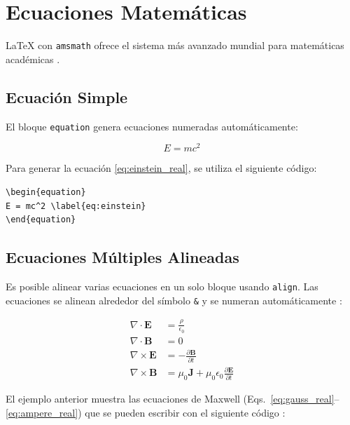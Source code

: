\section{Ecuaciones Matemáticas}

\LaTeX{} con \texttt{amsmath} ofrece el sistema más avanzado mundial para matemáticas académicas \cite{amsmath_manual}.

\subsection{Ecuación Simple}

El bloque \texttt{equation} genera ecuaciones numeradas automáticamente:

\begin{equation}
E = mc^2 \label{eq:einstein_real}
\end{equation}

Para generar la ecuación \eqref{eq:einstein_real}, se utiliza el siguiente código:

\begin{verbatim}
\begin{equation}
E = mc^2 \label{eq:einstein}
\end{equation}
\end{verbatim}


\subsection{Ecuaciones Múltiples Alineadas}

Es posible alinear varias ecuaciones en un solo bloque usando \texttt{align}. Las ecuaciones se alinean alrededor del símbolo \texttt{\&} y se numeran automáticamente \cite{amsmath_manual}:

\begin{align}
\nabla \cdot \mathbf{E} &= \frac{\rho}{\epsilon_0} \label{eq:gauss_real} \\
\nabla \cdot \mathbf{B} &= 0 \label{eq:gauss_mag_real} \\
\nabla \times \mathbf{E} &= -\frac{\partial \mathbf{B}}{\partial t} \label{eq:faraday_real} \\
\nabla \times \mathbf{B} &= \mu_0\mathbf{J}+\mu_0\epsilon_0\frac{\partial\mathbf{E}}{\partial t} \label{eq:ampere_real}
\end{align}

El ejemplo anterior muestra las ecuaciones de Maxwell (Eqs.~\eqref{eq:gauss_real}--\eqref{eq:ampere_real}) que se pueden escribir con el siguiente código \cite{amsmath_manual}:

